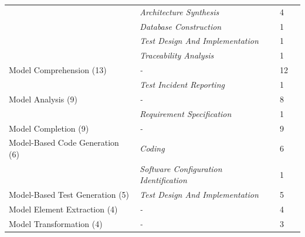 \begin{tabular} {p{}  p{} p{} p{}}
 & \emph{Architecture Synthesis} & 4 & \cite{ \papertwelfth,\paperthirteenth,\paperonehundredfirst,\paperonehundredfourth }\\ 
 & \emph{Database Construction} & 1 & \cite{ \paperonehundredseventeenth }\\ 
 & \emph{Test Design And Implementation} & 1 & \cite{ \papereightyfourth }\\ 
 & \emph{Traceability Analysis} & 1 & \cite{ \paperfourteenth }\\ 
\midrule  
Model Comprehension (13) & \emph{-} & 12 & \cite{ \paperthirtythird,\paperthirtyfourth,\paperfortythird,\paperseventyninth,\papereightyfifth,\papereightyseventh,\paperninetyfourth,\paperonehundredfortyfourth,\papertwohundredtenth,\papertwohundredthirtysecond,\papertwohundredthirtythird,\papertwohundredthirtyfifth }\\ 
 & \emph{Test Incident Reporting} & 1 & \cite{ \papersixtyfifth }\\ 
\midrule  
Model Analysis (9) & \emph{-} & 8 & \cite{ \paperfirst,\papereleventh,\paperthirtysixth,\paperonehundredthirteenth,\paperonehundredninetyfifth,\papertwohundrednineteenth,\papertwohundredthirtyninth,\papertwohundredfortyseventh }\\ 
 & \emph{Requirement Specification} & 1 & \cite{ \paperseventieth }\\ 
\midrule  
Model Completion (9) & \emph{-} & 9 & \cite{ \papersixtyseventh,\paperninetythird,\paperninetysixth,\paperonehundredtwentythird,\paperonehundredsixtieth,\paperonehundredseventysecond,\paperonehundredseventyfourth,\paperonehundredeightieth,\papertwohundredthirtieth }\\ 
\midrule  
Model-Based Code Generation (6) & \emph{Coding} & 6 & \cite{ \papereighth,\paperfortyseventh,\papereightythird,\paperonehundredeighteenth,\paperonehundredninetysixth,\papertwohundredthirtyeighth }\\ 
 & \emph{Software Configuration Identification} & 1 & \cite{ \papereightythird }\\ 
\midrule  
Model-Based Test Generation (5) & \emph{Test Design And Implementation} & 5 & \cite{ \paperthird,\papereightieth,\papereightyfourth,\paperninetysecond,\papertwohundredthirtyeighth }\\ 
\midrule  
Model Element Extraction (4) & \emph{-} & 4 & \cite{ \paperthirtyninth,\papereightyeighth,\paperonehundredfifth,\paperonehundredthirtysixth }\\ 
\midrule  
Model Transformation (4) & \emph{-} & 3 & \cite{ \papertenth,\paperonehundredfiftyfirst,\papertwohundredeighth }\\ 

\end{tabular}
